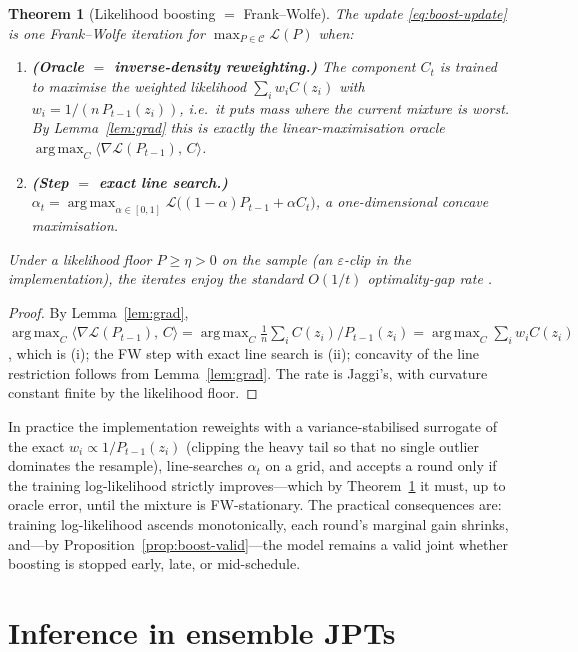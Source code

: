 \documentclass[11pt]{article}
\theoremstyle{plain}
\newtheorem{theorem}{Theorem}
\theoremstyle{definition}
\theoremstyle{remark}
\DeclareMathOperator*{\argmax}{arg\,max}
\newcommand{\inner}[2]{\langle #1,\, #2\rangle}
\newcommand{\eps}{\varepsilon}
\begin{document}
\begin{theorem}[Likelihood boosting $=$ Frank--Wolfe]
\label{thm:fw}
The update \eqref{eq:boost-update} is one Frank--Wolfe iteration for
$\max_{P\in\mathcal{C}}\mathcal{L}(P)$ when:
\begin{enumerate}[label=(\roman*),leftmargin=2em]
\item \textbf{(Oracle $=$ inverse-density reweighting.)} The component
$C_t$ is trained to maximise the weighted likelihood
$\sum_i w_i C(z_i)$ with $w_i=1/(n\,P_{t-1}(z_i))$, i.e.\ it puts mass
where the current mixture is worst. By Lemma~\ref{lem:grad} this is
exactly the linear-maximisation oracle
$\argmax_{C}\inner{\nabla\mathcal{L}(P_{t-1})}{C}$.
\item \textbf{(Step $=$ exact line search.)}
$\alpha_t=\argmax_{\alpha\in[0,1]}
\mathcal{L}\big((1-\alpha)P_{t-1}+\alpha C_t\big)$, a one-dimensional
concave maximisation.
\end{enumerate}
Under a likelihood floor $P\ge\eta>0$ on the sample (an $\eps$-clip in
the implementation), the iterates enjoy the standard $O(1/t)$
optimality-gap rate \citep{jaggi2013fw}.
\end{theorem}
\begin{proof}
By Lemma~\ref{lem:grad},
$\argmax_{C}\inner{\nabla\mathcal{L}(P_{t-1})}{C}
=\argmax_C \frac1n\sum_i C(z_i)/P_{t-1}(z_i)
=\argmax_C\sum_i w_i C(z_i)$, which is (i); the FW step with exact line
search is (ii); concavity of the line restriction follows from
Lemma~\ref{lem:grad}. The rate is Jaggi's, with curvature constant finite
by the likelihood floor.
\end{proof}

In practice the implementation reweights with a variance-stabilised
surrogate of the exact $w_i\propto 1/P_{t-1}(z_i)$ (clipping the heavy
tail so that no single outlier dominates the resample), line-searches
$\alpha_t$ on a grid, and accepts a round only if the training
log-likelihood strictly improves---which by Theorem~\ref{thm:fw} it must,
up to oracle error, until the mixture is FW-stationary. The practical
consequences are: training log-likelihood ascends monotonically, each
round's marginal gain shrinks, and---by
Proposition~\ref{prop:boost-valid}---the model remains a valid joint
whether boosting is stopped early, late, or mid-schedule.

\section{Inference in ensemble JPTs}
\label{sec:inference}
\end{document}
